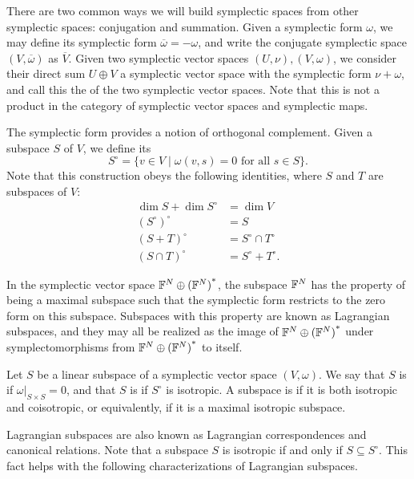 There are two common ways we will build symplectic spaces from other
symplectic spaces: conjugation and summation. Given a symplectic form $\omega$,
we may define its  symplectic form $\overline\omega = -
\omega$, and write the conjugate symplectic space $(V,\overline\omega)$ as
$\overline V$. Given two symplectic vector spaces $(U, \nu),(V,\omega)$, we
consider their direct sum $U \oplus V$ a symplectic vector space with the
symplectic form $\nu+\omega$, and call this the  of the two
symplectic vector spaces. Note that this is not a product in the category of
symplectic vector spaces and symplectic maps.

The symplectic form provides a notion of orthogonal complement.  Given a subspace $S$ of $V$, we define its 
\[
  S^\circ = \{v \in V \mid \omega(v,s) = 0 \textrm{ for all } s \in S\}.
\]
Note that this construction obeys the following identities, where $S$ and $T$
are subspaces of $V$:
\begin{align*}
  \dim S+ \dim S^\circ &= \dim V \\
  (S^\circ)^\circ &= S \\
  (S + T)^\circ &= S^\circ \cap T^\circ \\
  (S \cap T)^\circ &= S^\circ + T^\circ.
\end{align*}

In the symplectic vector space ${{\mathbb F}^{N} \oplus {({\mathbb F}^{N})}^\ast}$, the subspace ${\mathbb F}^N$ has the
property of being a maximal subspace such that the symplectic form restricts to
the zero form on this subspace. Subspaces with this property are known as Lagrangian
subspaces, and they may all be realized as the image of ${{\mathbb F}^{N} \oplus {({\mathbb F}^{N})}^\ast}$ 
under symplectomorphisms from ${{\mathbb F}^{N} \oplus {({\mathbb F}^{N})}^\ast}$ to itself.

\begin{definition} 
  Let $S$ be a linear subspace of a symplectic vector space $(V,\omega)$. We say
  that $S$ is  if $\omega|_{S \times S} = 0$, and that $S$ is
   if $S^\circ$ is isotropic. A subspace is
   if it is both isotropic and coisotropic, or equivalently, if it  
  is a maximal isotropic subspace.
\end{definition}

Lagrangian subspaces are also known as Lagrangian correspondences and canonical
relations. Note that a subspace $S$ is isotropic if and only if $S \subseteq
S^\circ$. This fact helps with the following characterizations of Lagrangian
subspaces.

